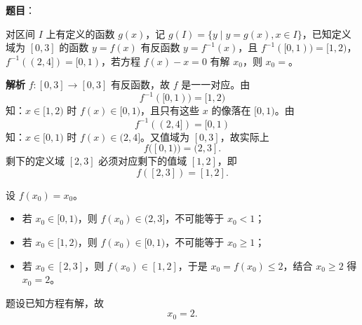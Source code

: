 \begin{answer}

\textbf{题目}：

对区间 $I$ 上有定义的函数 $g(x)$，记 $g(I)=\{y\mid y=g(x),x\in I\}$，已知定义域为 $[0,3]$ 的函数 $y=f(x)$ 有反函数 $y=f^{-1}(x)$，且 $f^{-1}([0,1))=[1,2)$，$f^{-1}((2,4])=[0,1)$，若方程 $f(x)-x=0$ 有解 $x_0$，则 $x_0=$\gkblank{}。

\textbf{解析}
$f:[0,3]\to[0,3]$ 有反函数，故 $f$ 是一一对应。由
\nopagebreak[4]
\[f^{-1}([0,1))=[1,2)\]
知：$x\in[1,2)$ 时 $f(x)\in[0,1)$，且只有这些 $x$ 的像落在 $[0,1)$。由
\nopagebreak[4]
\[f^{-1}((2,4])=[0,1)\]
知：$x\in[0,1)$ 时 $f(x)\in(2,4]$。又值域为 $[0,3]$，故实际上
\nopagebreak[4]
\[f([0,1))=(2,3].\]
剩下的定义域 $[2,3]$ 必须对应剩下的值域 $[1,2]$，即
\nopagebreak[4]
\[f([2,3])=[1,2].\]

设 $f(x_0)=x_0$。

\begin{itemize}
\item 若 $x_0\in[0,1)$，则 $f(x_0)\in(2,3]$，不可能等于 $x_0<1$；
\item 若 $x_0\in[1,2)$，则 $f(x_0)\in[0,1)$，不可能等于 $x_0\geqslant1$；
\item 若 $x_0\in[2,3]$，则 $f(x_0)\in[1,2]$，于是 $x_0=f(x_0)\leqslant2$，结合 $x_0\geqslant2$ 得 $x_0=2$。
\end{itemize}

题设已知方程有解，故
\nopagebreak[4]
\[x_0=2.\]

\gkanswer{答案：$2$。由反函数对应关系，$[0,1)$ 映到 $(2,3]$，$[1,2)$ 映到 $[0,1)$，$[2,3]$ 映到 $[1,2]$；前两段无不动点，第三段只能在 $x=2$ 取等。}

\end{answer}
